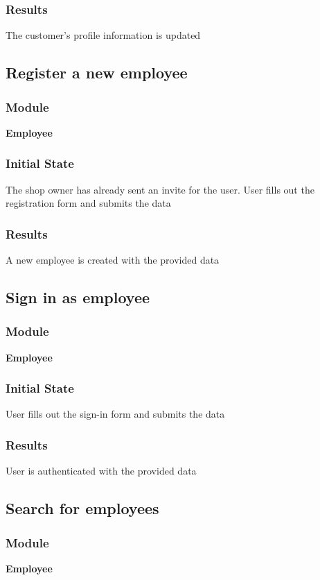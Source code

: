 \documentclass[12pt, titlepage]{article}
\begin{document}
    \subsubsection{Results}
    The customer's profile information is updated

\subsection{Register a new employee}
    \subsubsection{Module}
    \textbf{Employee}
    \subsubsection{Initial State}
    The shop owner has already sent an invite for the user.
    User fills out the registration form and submits the data
    \subsubsection{Results}
    A new employee is created with the provided data

\subsection{Sign in as employee}
    \subsubsection{Module}
    \textbf{Employee}
    \subsubsection{Initial State}
    User fills out the sign-in form and submits the data
    \subsubsection{Results}
    User is authenticated with the provided data

\subsection{Search for employees}
    \subsubsection{Module}
    \textbf{Employee}
\end{document}
